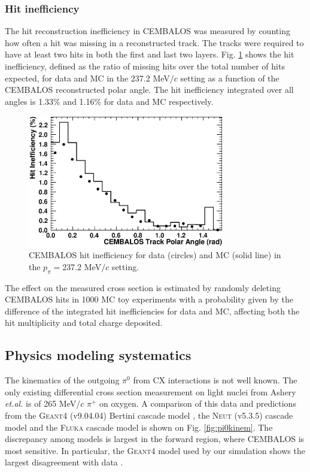 \subsubsection{\bf Hit inefficiency}
The hit reconstruction inefficiency in CEMBALOS was measured by counting how often a hit was missing in a reconstructed track. The tracks were required to have at least two hits in both the first and last two layers. Fig. \ref{fig:hit_ineff} shows the hit inefficiency, defined as the ratio of missing hits over the total number of hits expected, for data and MC in the 237.2 MeV$/c$ setting as a function of the CEMBALOS reconstructed polar angle. The hit inefficiency integrated over all angles is 1.33\% and 1.16\% for data and MC respectively.
\begin{figure}[ht]
 \includegraphics[width=86mm]{figures/cembalos_hit_ineff_237.eps}
 \caption{CEMBALOS hit inefficiency for data (circles) and MC (solid line) in the $p_\pi=$237.2 MeV$/c$ setting.}
 \label{fig:hit_ineff}
\end{figure}

The effect on the measured cross section is estimated by randomly deleting CEMBALOS hits in 1000 MC toy experiments with a probability given by the difference of the integrated hit inefficiencies for data and MC, affecting both the hit multiplicity and total charge deposited.

\subsection{Physics modeling systematics}\label{sec:physics_syst}
The kinematics of the outgoing $\pi^0$ from CX interactions is not well known. The only existing differential cross section measurement on light nuclei from Ashery \textit{et.al.} \cite{Ashery2} is of 265 MeV$/c$ $\pi^{+}$ on oxygen. A comparison of this data and predictions from the \textsc{Geant4} (v9.04.04) Bertini cascade model \cite{bertini}, the \textsc{Neut} (v5.3.5) cascade model \cite{NEUT} and the \textsc{Fluka} cascade model \cite{fluka1,fluka2} is shown on Fig. \ref{fig:pi0kinem}. The discrepancy among models is largest in the forward region, where CEMBALOS is most sensitive. In particular, the \textsc{Geant4} model used by our simulation shows the largest disagreement with data \cite{Ashery2}.

